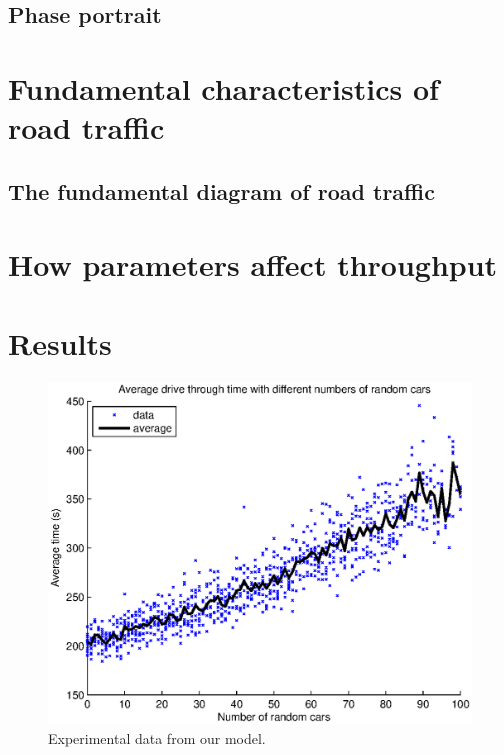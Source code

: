 \documentclass[11pt,a4paper]{article}
\begin{document}
\subsection{Phase portrait}

\section{Fundamental characteristics of road traffic}
\subsection{The fundamental diagram of road traffic}


\section{How parameters affect throughput}

\section{Results}

\begin{figure}[ht]
\centering
\includegraphics[width=400pt]{drivethrough}
\caption{Experimental data from our model.}
\label{drivethrough}
\end{figure}
\end{document}
